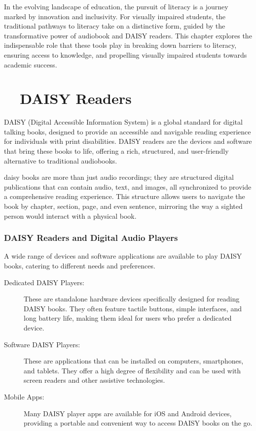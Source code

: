In the evolving landscape of education, the pursuit of literacy is a journey marked by innovation and inclusivity. For visually impaired students, the traditional pathways to literacy take on a distinctive form, guided by the transformative power of audiobook and DAISY readers. This chapter explores the indispensable role that these tools play in breaking down barriers to literacy, ensuring access to knowledge, and propelling visually impaired students towards academic success.\supercite{Bookshare, BARDMobile, Audible}

\section{~~DAISY Readers}\label{ch7:sec:daisy-readers}

DAISY (Digital Accessible Information System) is a global standard for digital talking books, designed to provide an accessible and navigable reading experience for individuals with print disabilities. DAISY readers are the devices and software that bring these books to life, offering a rich, structured, and user-friendly alternative to traditional audiobooks.\supercite{DAISY2024, Wikipedia2024}

\gls{daisy} books are more than just \gls{audio} recordings; they are structured digital publications that can contain \gls{audio}, text, and images, all synchronized to provide a comprehensive reading experience. This structure allows users to navigate the book by chapter, section, page, and even sentence, mirroring the way a sighted person would interact with a physical book.\supercite{MDPI2022}

\subsubsection{DAISY Readers and Digital Audio Players}

A wide range of devices and \gls{software} applications are available to play DAISY books, catering to different needs and preferences.

\begin{description}
	\item[Dedicated DAISY Players:] These are standalone hardware devices specifically designed for reading DAISY books. They often feature tactile buttons, simple interfaces, and long battery life, making them ideal for users who prefer a dedicated device.
	\item[Software DAISY Players:] These are applications that can be installed on computers, smartphones, and tablets. They offer a high degree of flexibility and can be used with screen readers and other assistive technologies.
	\item[Mobile Apps:] Many DAISY player apps are available for iOS and Android devices, providing a portable and convenient way to access DAISY books on the go.
\end{description}


